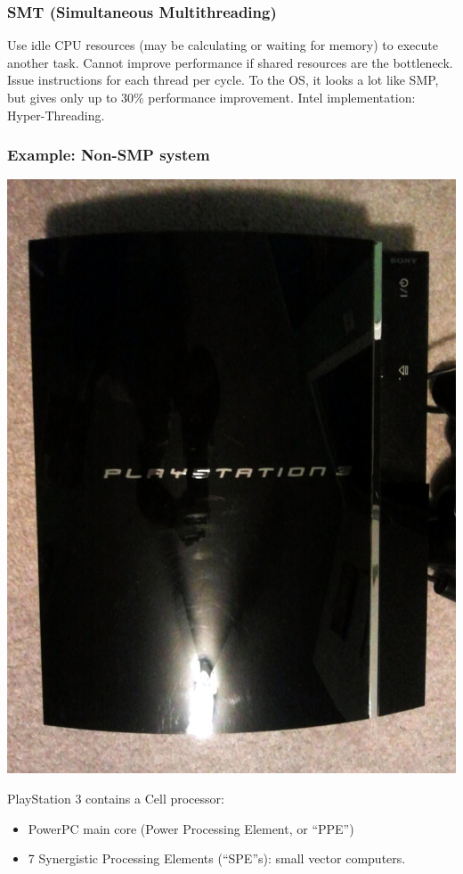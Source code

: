 \begin{frame}
  \frametitle{SMT (Simultaneous Multithreading)}


    Use idle CPU resources (may be calculating or waiting
          for memory) to execute another task.
    \vfill
    Cannot improve performance if shared resources are the bottleneck.
    \vfill
    Issue instructions for each thread per cycle.
    \vfill
    To the OS, it looks a lot like SMP, but gives only up to 30\% performance improvement.
    \vfill
Intel implementation: Hyper-Threading.

\end{frame}

\begin{frame}
  \frametitle{Example: Non-SMP system}

\begin{center}
  \includegraphics[height=.5\textheight]{images/ps3-small}
\end{center}

  PlayStation 3 contains a Cell processor:
  \begin{itemize}
    \item PowerPC main core (Power Processing Element, or ``PPE'')
    \item 7 Synergistic Processing Elements (``SPE''s): small vector computers.
  \end{itemize}
\end{frame}

